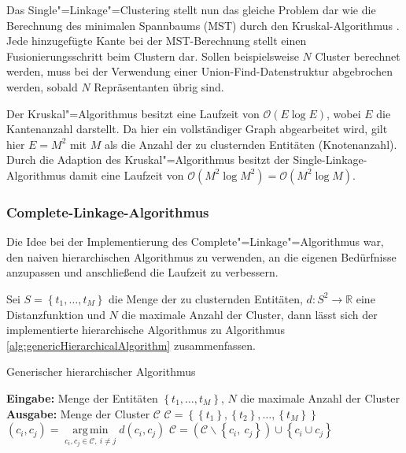 Das Single"=Linkage"=Clustering stellt nun das gleiche Problem 
dar wie die Berechnung des minimalen Spannbaums (MST) durch 
den Kruskal-Algorithmus \cite{Kru1956}. Jede hinzugefügte 
Kante bei der MST-Berechnung stellt einen Fusionierungsschritt 
beim Clustern dar. Sollen beispielsweise $N$ Cluster berechnet 
werden, muss bei der Verwendung einer Union-Find-Datenstruktur 
abgebrochen werden, sobald $N$ Repräsentanten übrig sind.

Der Kruskal"=Algorithmus besitzt eine Laufzeit von $\mathcal{O}(E \log E)$, wobei $E$ die Kantenanzahl darstellt. Da hier ein vollständiger Graph abgearbeitet wird, gilt hier $E = M^2$ mit $M$ als die Anzahl der zu clusternden Entitäten (Knotenanzahl). Durch die Adaption des Kruskal"=Algorithmus besitzt der Single-Linkage-Algorithmus damit eine Laufzeit von $\mathcal{O}(M^2 \log M^2) = \mathcal{O}(M^2 \log M)$.


\subsubsection{Complete-Linkage-Algorithmus}
Die Idee bei der Implementierung des Complete"=Linkage"=Algorithmus 
war, den naiven hierarchischen Algorithmus zu verwenden, 
an die eigenen Bedürfnisse anzupassen und anschließend die
Laufzeit zu verbessern.

Sei $S=\left\lbrace t_1, \dots, t_M \right\rbrace$ die Menge der zu clusternden Entitäten, 
$d:S^2 \rightarrow \mathbb{R}$ eine Distanzfunktion und $N$ die maximale Anzahl der Cluster,
dann lässt sich der implementierte hierarchische Algorithmus zu Algorithmus \ref{alg:genericHierarchicalAlgorithm}
zusammenfassen.

\begin{algorithm}
 \caption{Generischer hierarchischer Algorithmus}\label{alg:genericHierarchicalAlgorithm}
\begin{algorithmic}[1]
\Statex \textbf{Eingabe:} Menge der Entitäten $\left\lbrace t_1, \dots, t_M\right\rbrace$, $N$ die maximale Anzahl der Cluster
\Statex \textbf{Ausgabe:} Menge der Cluster $\mathcal{C}$
\State $\mathcal{C} = \left\lbrace \left\lbrace t_1 \right\rbrace, \left\lbrace t_2 \right\rbrace, \dots, \left\lbrace t_M \right\rbrace  \right\rbrace$
\State $(c_i, c_j) = \operatorname*{arg\,min}\limits_{c_i,c_j \in \mathcal{C},\ i \not= j}  d(c_i, c_j)$
\State $\mathcal{C} = \left( \mathcal{C}\backslash{\left\lbrace c_i,\ c_j \right\rbrace}\right) \cup \left\lbrace c_i \cup c_j \right\rbrace $
\EndFor
\end{algorithmic}
\end{algorithm}

